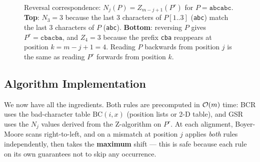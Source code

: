 \begin{figure}[H]
\caption{Reversal correspondence: $N_j(P) = Z_{m-j+1}(P^r)$ for
  $P = \texttt{abcabc}$.
  \textbf{Top}: $N_3 = 3$ because the last 3 characters of $P[1..3]$
  (\textcolor{orange!60!black}{\texttt{abc}}) match the last 3 characters
  of $P$ (\textcolor{orange!60!black}{\texttt{abc}}).
  \textbf{Bottom}: reversing $P$ gives $P^r = \texttt{cbacba}$, and
  $Z_4 = 3$ because the prefix \textcolor{violet!60!black}{\texttt{cba}}
  reappears at position $k = m - j + 1 = 4$.
  Reading $P$ backwards from position $j$ is the same as reading $P^r$
  forwards from position $k$.}
\label{fig:nj-zk-correspondence}
\end{figure}

\subsection{Algorithm Implementation}

We now have all the ingredients.
Both rules are precomputed in $\mathcal{O}\!\left(m\right)$ time:
BCR uses the bad-character table $\mathrm{BC}(i, x)$ (position lists or 2-D table),
and GSR uses the $N_j$ values derived from the Z-algorithm on $P^r$.
At each alignment, Boyer-Moore scans right-to-left, and on a mismatch at
position $j$ applies \emph{both} rules independently, then takes the
\textbf{maximum} shift --- this is safe because each rule on its own
guarantees not to skip any occurrence.

